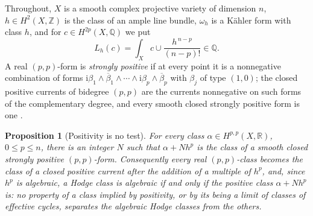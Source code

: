 \documentclass[11pt,reqno]{amsart}
\theoremstyle{plain}
\newtheorem{proposition}[theorem]{Proposition}
\theoremstyle{definition}
\theoremstyle{remark}
\newcommand{\QQ}{\mathbb{Q}}
\newcommand{\ZZ}{\mathbb{Z}}
\newcommand{\RR}{\mathbb{R}}
\newcommand{\bbar}[1]{\overline{#1}}
\begin{document}
Throughout, $X$ is a smooth complex projective variety of dimension $n$, $h\in
H^{2}(X,\ZZ)$ is the class of an ample line bundle, $\omega_{h}$ is a K\"ahler
form with class $h$, and for $c\in H^{2p}(X,\QQ)$ we put
\[
  L_{h}(c)=\int_{X}c\cup\frac{h^{\,n-p}}{(n-p)!}\in\QQ .
\]
A real $(p,p)$-form is \emph{strongly positive} if at every point it is a
nonnegative combination of forms $\mathrm{i}\beta_{1}\wedge\bbar{\beta}_{1}
\wedge\cdots\wedge\mathrm{i}\beta_{p}\wedge\bbar{\beta}_{p}$ with $\beta_{j}$
of type $(1,0)$; the closed positive currents of bidegree $(p,p)$ are the
currents nonnegative on such forms of the complementary degree, and every
smooth closed strongly positive form is one \cite[Chapter~III]{Dem12}.

\begin{proposition}[Positivity is no test]\label{prop:positivitynotest}
For every class $\alpha\in H^{p,p}(X,\RR)$, $0\le p\le n$, there is an integer
$N$ such that $\alpha+Nh^{p}$ is the class of a smooth closed strongly positive
$(p,p)$-form. Consequently every real $(p,p)$-class becomes the class of a
closed positive current after the addition of a multiple of $h^{p}$, and, since
$h^{p}$ is algebraic, a Hodge class is algebraic if and only if the positive
class $\alpha+Nh^{p}$ is: no property of a class implied by positivity, or by
its being a limit of classes of effective cycles, separates the algebraic Hodge
classes from the others.
\end{proposition}
\end{document}

